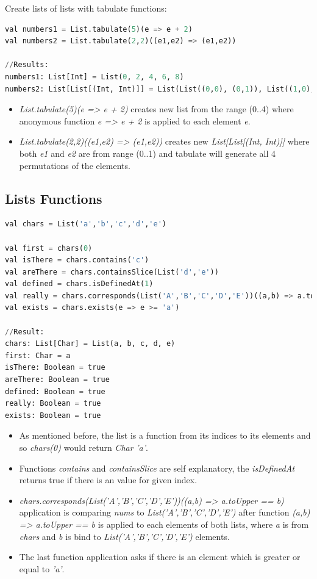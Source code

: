\documentclass[12pt,twoside,a4paper]{report}
\begin{document}
Create lists of lists with tabulate functions:
\begin{lstlisting}[language=python]
val numbers1 = List.tabulate(5)(e => e + 2)
val numbers2 = List.tabulate(2,2)((e1,e2) => (e1,e2))

//Results:
numbers1: List[Int] = List(0, 2, 4, 6, 8)
numbers2: List[List[(Int, Int)]] = List(List((0,0), (0,1)), List((1,0), (1,1)))
\end{lstlisting}

\begin{itemize}\itemsep1pt \parskip0pt 
\item \emph{List.tabulate(5)(e => e + 2)} creates new list from the range (0..4) where anonymous function \emph{e => e + 2} is applied to each element \emph{e}.
\item \emph{List.tabulate(2,2)((e1,e2) => (e1,e2))} creates new \emph{List[List[(Int, Int)]]} where both \emph{e1} and \emph{e2} are from range (0..1) and tabulate will generate all 4 permutations of the elements.
\end{itemize}

\subsection{Lists Functions}\label{6.7.2}

\begin{lstlisting}[language=python]
val chars = List('a','b','c','d','e')
  
val first = chars(0)
val isThere = chars.contains('c')  
val areThere = chars.containsSlice(List('d','e'))
val defined = chars.isDefinedAt(1)
val really = chars.corresponds(List('A','B','C','D','E'))((a,b) => a.toUpper == b)
val exists = chars.exists(e => e >= 'a')  

//Result:
chars: List[Char] = List(a, b, c, d, e)
first: Char = a
isThere: Boolean = true
areThere: Boolean = true
defined: Boolean = true
really: Boolean = true
exists: Boolean = true
\end{lstlisting}

\begin{itemize}\itemsep1pt \parskip0pt 
\item As mentioned before, the list is a function from its indices to its elements and so \emph{chars(0)} would return \emph{Char} \emph{'a'}.
\item Functions \emph{contains} and \emph{containsSlice} are self explanatory, the \emph{isDefinedAt} returns true if there is an value for given index.
\item \emph{chars.corresponds(List('A','B','C','D','E'))((a,b) => a.toUpper == b)} application is comparing \emph{nums} to \emph{List('A','B','C','D','E')} after function \emph{(a,b) => a.toUpper == b} is applied to each elements of both lists, where \emph{a} is from \emph{chars} and \emph{b} is bind to \emph{List('A','B','C','D','E')} elements.
\item The last function application asks if there is an element which is greater or equal to \emph{'a'}.
\end{itemize}
\end{document}
